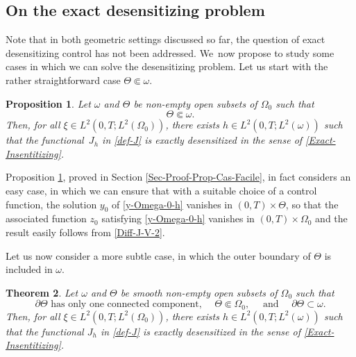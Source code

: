 \documentclass[11pt]{article}
\numberwithin{equation}{section}
\newcounter{question}
\newtheorem{theorem}{Theorem}[section]
\newtheorem{proposition}[theorem]{Proposition}
\theoremstyle{definition}
\begin{document}
\subsection*{On the exact desensitizing problem}

Note that in both geometric settings discussed so far, the question of exact desensitizing control has not been addressed. We~now propose to study some cases in which we can solve the desensitizing problem. Let us start with the rather straightforward case $ \Theta \Subset \omega$.

\begin{proposition}
\label{Prop-Cas-Facile}
Let $\omega$ and $\Theta$ be non-empty open subsets of $\Omega_0$ such that
\begin{equation}
\label{Assumption-EasyCase}
\Theta \Subset \omega.
\end{equation}
Then, for all $\xi\!\in\! L^2(0,T; L^2(\Omega_0))$, there exists $h\!\in\! L^2(0,T; L^2(\omega))$ such that the func\-tional~$J_h$ in \eqref{def-J} is exactly desensitized in the sense of \eqref{Exact-Insentitizing}.
\end{proposition}

Proposition \ref{Prop-Cas-Facile}, proved in Section \ref{Sec-Proof-Prop-Cas-Facile}, in fact considers an easy case, in which we can ensure that with a suitable choice of a control function, the solution $y_0$ of \eqref{y-Omega-0-h} vanishes in $(0,T) \times \Theta$, so that the associated function $z_0$ {satisfying} \eqref{y-Omega-0-h} vanishes in $(0,T) \times \Omega_0$ and the result easily follows from \eqref{Diff-J-V-2}.

Let us now consider a more subtle case, in which the outer boundary of $\Theta$ is included in $\omega$.

\begin{theorem}
\label{Thm-insensitizing-Boundary}
Let $\omega$ and $\Theta$ be smooth non-empty open subsets of $\Omega_0$ such that
\begin{equation}
\label{Assumption-insensitizing-Boundary}
\partial \Theta \text{ has only one connected component, } \quad \Theta \Subset \Omega_0, \quad \text{ and } \quad \partial \Theta \subset \omega.
\end{equation}
Then, for all $\xi \in L^2(0,T; L^2(\Omega_0))$, there exists $h \in L^2(0,T; L^2(\omega))$ such that the functional $J_h$ in \eqref{def-J} is exactly desensitized in the sense of \eqref{Exact-Insentitizing}.
\end{theorem}
\end{document}
